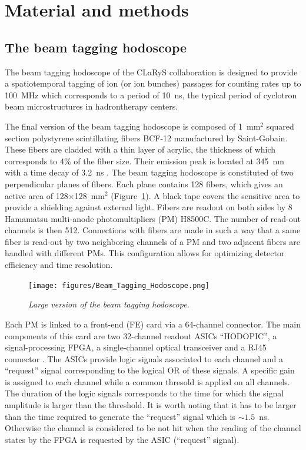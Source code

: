 \documentclass[a4paper,11pt]{article}
\begin{document}
\section{Material and methods}
\subsection{The beam tagging hodoscope}
\label{sec:hodo}

The beam tagging hodoscope of the CLaRyS collaboration is designed to provide a spatiotemporal tagging of ion (or ion bunches) passages for counting rates up to 100~MHz which corresponds to a period of 10~ns, the typical period of cyclotron beam microstructures in hadrontherapy centers. 

The final version of the beam tagging hodoscope is composed  of 1~mm$^{2}$ squared section polystyrene scintillating fibers BCF-12 manufactured by Saint-Gobain. These fibers are cladded with a thin layer of acrylic, the thickness of which corresponds to 4\% of the fiber size. Their emission peak is located at 345~nm with a time decay of 3.2~ns \cite{SaintGobain2017}.
The beam tagging hodoscope is constituted of two perpendicular planes of fibers. Each plane contains 128 fibers, which gives an active area of 128$\times$128~mm$^{2}$ (Figure~\ref{fig:hodoscope}). A black tape covers the sensitive area to provide a shielding against external light. Fibers are readout on both sides by 8 Hamamatsu multi-anode photomultipliers (PM) H8500C. The number of read-out channels is then 512. Connections with fibers are made in such a way that a same fiber is read-out by two neighboring channels of a PM and two adjacent fibers are handled with different PMs. This configuration allows for optimizing detector efficiency and time resolution. 

\begin{figure}[htb]
\centering
\texttt{[image: figures/Beam\_Tagging\_Hodoscope.png]}
\caption{\small{\textit{Large version of the beam tagging hodoscope.}}}
\label{fig:hodoscope}
\end{figure}

Each PM is linked to a front-end (FE) card via a 64-channel connector. The main components of this card are two 32-channel readout ASICs \enquote{HODOPIC}, a signal-processing FPGA, a single-channel optical transceiver and a RJ45 connector \cite{Chen2019}. The ASICs provide logic signals associated to each channel and a \enquote{request} signal corresponding to the logical OR of these signals. A specific gain is assigned to each channel while a common thresold is applied on all channels. The duration of the logic signals corresponds to the time for which the signal amplitude is larger than the threshold. It is worth noting that it has to be larger than the time required to generate the \enquote{request} signal which is $\sim1.5$~ns. Otherwise the channel is considered to be not hit when the reading of the channel states by the FPGA is requested by the ASIC (\enquote{request} signal).
\end{document}
